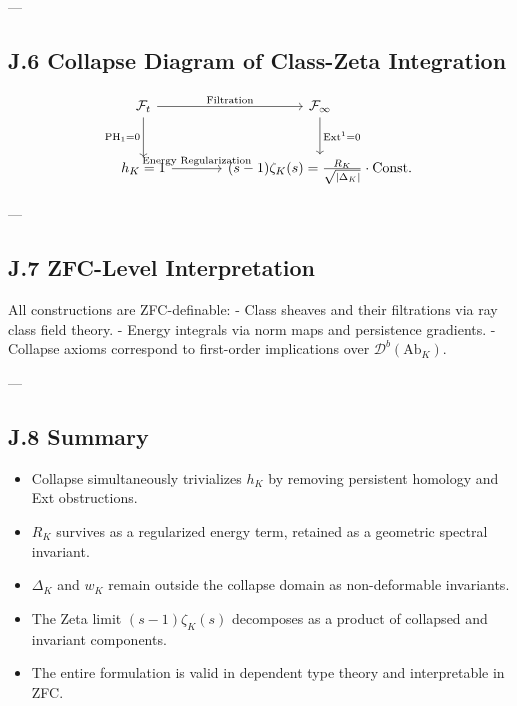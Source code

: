 \documentclass[11pt]{article}
\begin{document}
---

\subsection*{J.6 Collapse Diagram of Class-Zeta Integration}

\[
\begin{tikzcd}[column sep=large, row sep=large]
\mathcal{F}_t \arrow[r, "\text{Filtration}"] \arrow[d, "\mathrm{PH}_1 = 0"'] 
& \mathcal{F}_\infty \arrow[d, "\mathrm{Ext}^1 = 0"] \\
h_K = 1 \arrow[r, "\text{Energy Regularization}"] 
& (s - 1)\zeta_K(s) = \frac{R_K}{\sqrt{|\Delta_K|}} \cdot \text{Const.}
\end{tikzcd}
\]

---

\subsection*{J.7 ZFC-Level Interpretation}

All constructions are ZFC-definable:
- Class sheaves and their filtrations via ray class field theory.
- Energy integrals via norm maps and persistence gradients.
- Collapse axioms correspond to first-order implications over $\mathcal{D}^b(\text{Ab}_K)$.

---

\subsection*{J.8 Summary}

\begin{itemize}
  \item Collapse simultaneously trivializes $h_K$ by removing persistent homology and Ext obstructions.
  \item $R_K$ survives as a regularized energy term, retained as a geometric spectral invariant.
  \item $\Delta_K$ and $w_K$ remain outside the collapse domain as non-deformable invariants.
  \item The Zeta limit $(s - 1)\zeta_K(s)$ decomposes as a product of collapsed and invariant components.
  \item The entire formulation is valid in dependent type theory and interpretable in ZFC.
\end{itemize}



\end{document}
